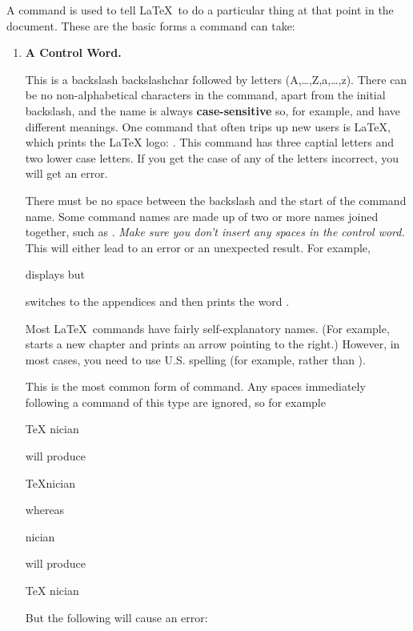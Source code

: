 A \gls*{command} is used to tell \LaTeX\ to do a particular thing
at that point in the document. These are the basic forms a command
can take:

\begin{enumerate}
\item \label{itm:controlword}\textbf{A Control Word.}

This is a backslash \gls{backslashchar} followed by letters (A,\ldots,Z,a,\ldots,z). There can be no
non-alphabetical characters in the command, apart from the initial
backslash, and the name is always \textbf{case-sensitive} so, for example, 
and  have different meanings. One command
that often trips up new users is \gls{LaTeX}, which prints the
LaTeX logo: . This command has three
captial letters and two lower case letters. If you get the case
of any of the letters incorrect, you will get an  error.

\strut\warning There must be no space between the backslash and the
start of the command name. Some command names are made up of two
or more names joined together, such as .
\emph{Make sure you don't insert any spaces in the control word.} This will
either lead to an error or an unexpected result.
For example, 
\begin{alltt}\correct
{}
\end{alltt}
displays \dq{\appendixname} but 
\begin{alltt}\wrong
{}
\end{alltt}
switches to the appendices and then prints the word .

Most \LaTeX\ commands have fairly self-explanatory names. 
(For example, \booklinebreak{} starts a new chapter and 
 prints an arrow pointing to the right.)
However, in most cases, you need to use U.S. spelling
(for example,  rather than ).

This is the most common form of command. Any spaces immediately
following a command of this type are ignored, so for example
\begin{codeS}
\gls{TeX} nician
\end{codeS}%
  will produce
\begin{resultS}
\TeX nician
\end{resultS}%
  whereas
\begin{codeS}
\marg{} nician
\end{codeS}%
  will produce
\begin{resultS}
\TeX{} nician
\end{resultS}%
\bookpagebreak
  But the following will cause an 
  error:
\begin{alltt}\wrong
{}
\end{alltt}


\end{enumerate}
